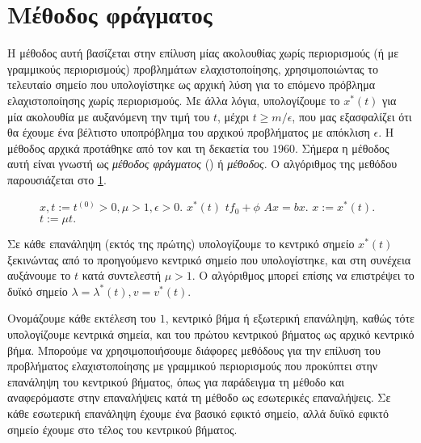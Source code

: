 \section{Μέθοδος φράγματος}
Η μέθοδος αυτή βασίζεται στην επίλυση μίας ακολουθίας χωρίς περιορισμούς (ή με
γραμμικούς περιορισμούς) προβλημάτων ελαχιστοποίησης, χρησιμοποιώντας το
τελευταίο σημείο που υπολογίστηκε ως αρχική λύση για το επόμενο πρόβλημα
ελαχιστοποίησης χωρίς περιορισμούς. Με άλλα λόγια, υπολογίζουμε το
\( x^*(t) \) για μία ακολουθία με αυξανόμενη την τιμή του \( t \), μέχρι
\(  t \geq m/\epsilon \), που μας εξασφαλίζει ότι θα έχουμε ένα βέλτιστο
υποπρόβλημα του αρχικού προβλήματος με απόκλιση \( \epsilon \).  Η μέθοδος
αρχικά προτάθηκε από τον  και  τη δεκαετία του
\(1960\). Σήμερα η μέθοδος αυτή είναι γνωστή ως \emph{μέθοδος φράγματος}
() ή \emph{ μέθοδος}. Ο αλγόριθμος της
μεθόδου παρουσιάζεται στο \ref{alg:ip_bm}.
\begin{figure}[h]
    \begin{otherlanguage}{english}
            \begin{algorithmic}
                \REQUIRE {}$x,
                t:=t^{(0)}>0,\mu>1,$$\epsilon>0.$
                \REPEAT
                \STATE {}
                \(x^*(t)\)
                \( tf_0 + \phi \)
                \STATE {} \(Ax = b \)\(x.\)
                \STATE {}\(x := x^*(t).\)
                \STATE {}\(t := \mu t.\)
            \end{algorithmic}
    \end{otherlanguage}
    \caption{}
    \label{alg:ip_bm}
\end{figure}

Σε κάθε επανάληψη (εκτός της πρώτης) υπολογίζουμε το κεντρικό σημείο
\( x^*(t) \) ξεκινώντας από το προηγούμενο κεντρικό σημείο που υπολογίστηκε, και
στη συνέχεια αυξάνουμε το \( t \) κατά συντελεστή \( \mu > 1 \). Ο αλγόριθμος
μπορεί επίσης να επιστρέψει το δυϊκό σημείο \( \lambda = \lambda^*(t), v =
v^*(t) \).

Ονομάζουμε κάθε εκτέλεση του \( 1 \), κεντρικό βήμα ή εξωτερική επανάληψη, καθώς τότε υπολογίζουμε
κεντρικά σημεία, και του πρώτου κεντρικού βήματος ως αρχικό κεντρικό βήμα.
Μπορούμε να χρησιμοποιήσουμε διάφορες μεθόδους για την επίλυση του προβλήματος
ελαχιστοποίησης με γραμμικού περιορισμούς που προκύπτει στην επανάληψη του κεντρικού
βήματος, όπως για παράδειγμα τη μέθοδο  και αναφερόμαστε στην
επαναλήψεις κατά τη μέθοδο  ως εσωτερικές επαναλήψεις. Σε κάθε
εσωτερική επανάληψη έχουμε ένα βασικό εφικτό σημείο, αλλά δυϊκό εφικτό σημείο
έχουμε στο τέλος του κεντρικού βήματος.

